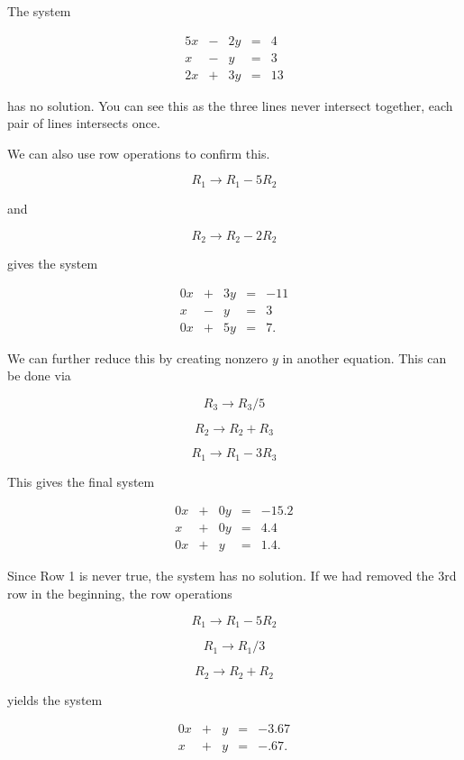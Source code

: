 \documentclass{ximera}
\begin{document}
        \begin{solution}
    
            The system
    
            $$\begin{array}{ccccc}
                    5x & -&2y&=&4 \\
                    x& -&y&=&3 \\
                    2x& +&3y&=&13
                \end{array}$$
    
            has no solution. You can see this as the three lines never intersect together, each pair of lines intersects once. 
    
            We can also use row operations to confirm this.
    
            $$R_1\rightarrow R_1-5R_2$$
    
            and
            
            $$R_2\rightarrow R_2-2R_2$$
    
            gives the system
    
            $$\begin{array}{ccccc}
                    0x & +&3y&=&-11 \\
                    x& -&y&=&3 \\
                    0x& +&5y&=&7.
                \end{array}$$
    
            We can further reduce this by creating nonzero $y$ in another equation. This can be done via
    
            $$R_3\rightarrow R_3/5$$
    
            $$R_2\rightarrow R_2+R_3$$
    
            $$R_1\rightarrow R_1-3R_3$$
    
            This gives the final system
    
            $$\begin{array}{ccccc}
                    0x & +&0y&=&-15.2 \\
                    x& +&0y&=&4.4 \\
                    0x& +&y&=&1.4.
                \end{array}$$
    
            Since Row 1 is never true, the system has no solution. If we had removed the 3rd row in the beginning, the row operations 
    
            $$R_1\rightarrow R_1-5R_2$$
    
            $$R_1\rightarrow R_1/3$$
    
            $$R_2\rightarrow R_2+R_2$$
    
            yields the system
    
            $$\begin{array}{ccccc}
                    0x & +&y&=&-3.67 \\
                    x& +&y&=&-.67.
                \end{array}$$
    
        \end{solution}
    
    
\end{document}
